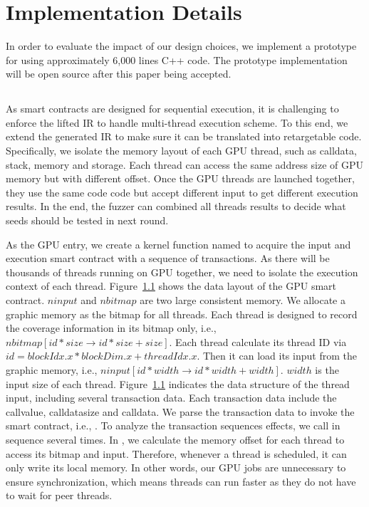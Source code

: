 \section{Implementation Details}

In order to evaluate the impact of our design choices, we implement a prototype for {\tool} using approximately 6,000 lines C++ code.
The prototype implementation will be open source after this paper being accepted.

\subsection{{\wrapper}}

As smart contracts are designed for sequential execution, it is challenging to enforce the lifted IR to handle multi-thread execution scheme. 
To this end, we extend the generated IR to make sure it can be translated into retargetable code.
Specifically, we isolate the memory layout of each GPU thread, such as calldata, stack, memory and storage.
Each thread can access the same address size of GPU memory but with different offset. Once the GPU threads are launched together, they use the same code code but accept different input to get different execution results. In the end, the fuzzer can combined all threads results to decide what seeds should be tested in next round.

As the GPU entry, we create a kernel function named  to acquire the input and execution smart contract with a sequence of transactions. 
As there will be thousands of threads running on GPU together, we need to isolate the execution context of each thread. 
Figure~\ref{} shows the data layout of the GPU smart contract. $ninput$ and $nbitmap$ are two large consistent memory.
We allocate a graphic memory as the bitmap for all threads. Each thread is designed to record the coverage information in its bitmap only, i.e., $nbitmap[id*size\to id*size+size]$. 
Each thread calculate its thread ID via $id = blockIdx.x * blockDim.x + threadIdx.x$. Then it can load its input from the graphic memory, i.e., $ninput[id*width\to id*width+width]$. $width$ is the input size of each thread. 
Figure~\ref{} indicates the data structure of the thread input, including several transaction data. Each transaction data include the callvalue, calldatasize and calldata. We parse the transaction data to invoke the smart contract, i.e., . To analyze the transaction sequences effects, we call  in sequence several times. 
In , we calculate the memory offset for each thread to access its bitmap and input.
Therefore, whenever a thread is scheduled, it can only write its local memory. In other words, our GPU jobs are unnecessary to ensure synchronization, which means threads can run faster as they do not have to wait for peer threads. 

